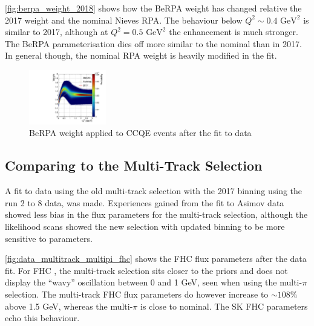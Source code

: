 \autoref{fig:berpa_weight_2018} shows how the BeRPA weight has changed relative the 2017 weight and the nominal Nieves RPA. The behaviour below $Q^2\sim0.4\text{ GeV}^2$ is similar to 2017, although at $Q^2=0.5\text{ GeV}^2$ the enhancement is much stronger. The BeRPA parameterisation dies off more similar to the nominal than in 2017. In general though, the nominal RPA weight is heavily modified in the fit.
\begin{figure}[h]
	\includegraphics[width=0.3\textwidth, trim={0mm 0mm 0mm 0mm}, clip]{figures/mach3/2018/data/2018a_MultiPi_Binningv6_NewCov_Data_merge_BeRPA}
	\caption{BeRPA weight applied to CCQE events after the fit to data}
	\label{fig:berpa_weight_2018}
\end{figure}

\subsection{Comparing to the Multi-Track Selection}
A fit to data using the old multi-track selection with the 2017 binning using the run 2 to 8 data, was made. Experiences gained from the fit to Asimov data showed less bias in the flux parameters for the multi-track selection, although the likelihood scans showed the new selection with updated binning to be more sensitive to parameters.

\autoref{fig:data_multitrack_multipi_fhc} shows the FHC flux parameters after the data fit. For FHC \numu, the multi-track selection sits closer to the priors and does not display the ``wavy'' oscillation between 0 and 1 GeV, seen when using the multi-$\pi$ selection. The multi-track FHC \numu flux parameters do however increase to $\sim108\%$ above 1.5 GeV, whereas the multi-$\pi$ is close to nominal. The SK FHC \numu parameters echo this behaviour.

